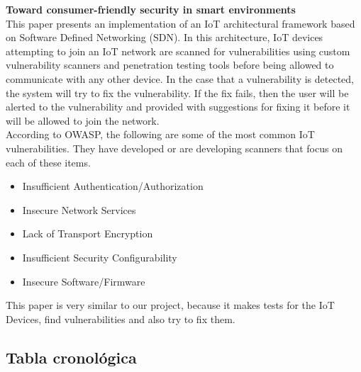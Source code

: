\textbf{Toward consumer-friendly security in smart environments}\cite{Paper7}\\
This paper presents an implementation of an IoT architectural framework based on Software Defined Networking (SDN). In this architecture, IoT devices attempting to join an IoT network are scanned for vulnerabilities using custom vulnerability scanners and penetration testing tools before being allowed to communicate with any other device. In the case that a vulnerability is detected, the system will try to fix the vulnerability. If the fix fails, then the user will be alerted to the vulnerability and provided with suggestions for fixing it before it will be allowed to join the network.\\
According to OWASP, the following are some of the most common IoT vulnerabilities. They have developed or are developing scanners that focus on each of these items.
\begin{itemize}
	\item Insufficient Authentication/Authorization
	\item Insecure Network Services
	\item Lack of Transport Encryption
	\item Insufficient  Security  Configurability
	\item Insecure Software/Firmware
\end{itemize}
This paper is very similar to our project, because it makes tests for the IoT Devices, find vulnerabilities and also try to fix them.

\subsection{Tabla cronológica}

